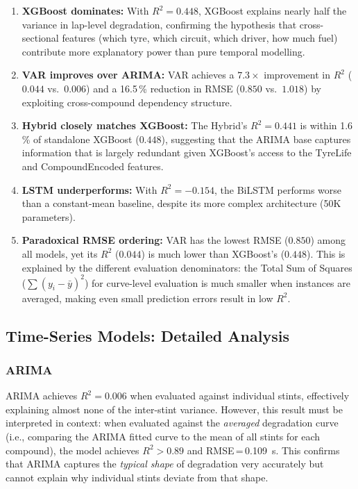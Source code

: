 \documentclass[journal,twoside]{IEEEtran}
\begin{document}
\begin{enumerate}
  \item \textbf{XGBoost dominates:} With $R^{2}=0.448$, XGBoost
  explains nearly half the variance in lap-level degradation, confirming
  the hypothesis that cross-sectional features (which tyre, which
  circuit, which driver, how much fuel) contribute more explanatory power
  than pure temporal modelling.

  \item \textbf{VAR improves over ARIMA:} VAR achieves a $7.3\times$
  improvement in $R^{2}$ ($0.044$ vs.\ $0.006$) and a 16.5\,\% reduction
  in RMSE ($0.850$ vs.\ $1.018$) by exploiting cross-compound dependency
  structure.

  \item \textbf{Hybrid closely matches XGBoost:} The Hybrid's
  $R^{2}=0.441$ is within 1.6\,\% of standalone XGBoost ($0.448$),
  suggesting that the ARIMA base captures information that is largely
  redundant given XGBoost's access to the TyreLife and CompoundEncoded
  features.

  \item \textbf{LSTM underperforms:} With $R^{2}=-0.154$, the BiLSTM
  performs worse than a constant-mean baseline, despite its more complex
  architecture (50K parameters).

  \item \textbf{Paradoxical RMSE ordering:} VAR has the lowest RMSE
  ($0.850$) among all models, yet its $R^{2}$ ($0.044$) is much lower
  than XGBoost's ($0.448$).  This is explained by the different
  evaluation denominators: the Total Sum of Squares ($\sum(y_i -
  \bar{y})^2$) for curve-level evaluation is much smaller when instances
  are averaged, making even small prediction errors result in low
  $R^{2}$.
\end{enumerate}

\subsection{Time-Series Models: Detailed Analysis}

\subsubsection{ARIMA}

ARIMA achieves $R^{2}=0.006$ when evaluated against individual stints,
effectively explaining almost none of the inter-stint variance.
However, this result must be interpreted in context: when evaluated
against the \emph{averaged} degradation curve (i.e., comparing the ARIMA
fitted curve to the mean of all stints for each compound), the model
achieves $R^{2} > 0.89$ and RMSE\,=\,\SI{0.109}{\second}.  This
confirms that ARIMA captures the \emph{typical shape} of degradation
very accurately but cannot explain why individual stints deviate from
that shape.
\end{document}
